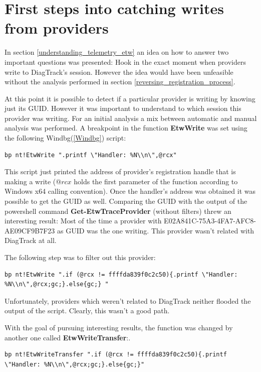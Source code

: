 \section{First steps into catching writes from providers}
In section \ref{understanding_telemetry_etw} an idea on how to answer two important questions was presented: Hook in the exact moment when providers write to DiagTrack's session. However the idea would have been unfeasible without the analysis performed in section \ref{reversing_registration_process}.

At this point it is possible to detect if a particular provider is writing by knowing just its GUID. However it was important to understand to which session this provider was writing. For an initial analysis a mix between automatic and manual analysis was performed. A breakpoint in the function {\bfseries EtwWrite} was set using the following Windbg(\ref{Windbg}) script:
\begin{lstlisting}
bp nt!EtwWrite ".printf \"Handler: %N\\n\",@rcx"
\end{lstlisting}

This script just printed the address of provider's registration handle that is making a write (@$rcx$ holds the first parameter of the function according to Windows x64 calling convention). Once the handler's address was obtained it was possible to get the GUID as well. Comparing the GUID with the output of the powershell command {\bfseries Get-EtwTraceProvider } (without filters) threw an interesting result: Most of the time a provider with E02A841C-75A3-4FA7-AFC8-AE09CF9B7F23 as GUID was the one writing. This provider wasn't related with DiagTrack at all. 

The following step was to filter out this provider: 
\begin{lstlisting}
bp nt!EtwWrite ".if (@rcx != ffffda839f0c2c50){.printf \"Handler: %N\\n\",@rcx;gc;}.else{gc;} "
\end{lstlisting}

Unfortunately, providers which weren't related to DiagTrack neither flooded the output of the script. Clearly, this wasn't a good path. 

With the goal of pursuing interesting results, the function was changed by another one called {\bfseries EtwWriteTransfer}:.

\begin{lstlisting}
bp nt!EtwWriteTransfer ".if (@rcx != ffffda839f0c2c50){.printf \"Handler: %N\\n\",@rcx;gc;}.else{gc;}"
\end{lstlisting}

